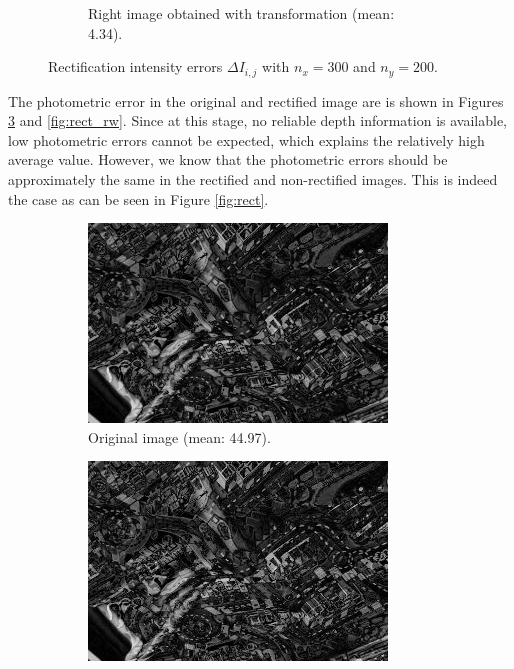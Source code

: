 \begin{figure}[h]
\begin{subfigure}[b]{0.7\textwidth}
    \caption{Right image obtained with transformation (mean: 4.34).}
    \label{fig:rect_r2_transform}
  \end{subfigure}
  \caption{Rectification intensity errors $\Delta I_{i,j}$ with $n_x = 300$ and $n_y = 200$.}
\end{figure}

The photometric error in the original and rectified image are is shown in Figures
\ref{fig:rect_ru} and \ref{fig:rect_rw}. Since at this stage, no reliable depth
information is available, low photometric errors cannot be expected, which explains 
the relatively high average value. However, we know that the photometric errors should 
be approximately the same in the rectified and non-rectified images.
This is indeed the case as can be seen in Figure \ref{fig:rect}.

\begin{figure}[h]
  \centering
  \begin{subfigure}[b]{0.49\textwidth}
    \includegraphics[width=\textwidth]{figures/rect_ru.jpg} 
    \caption{Original image (mean: 44.97).}
    \label{fig:rect_ru}
  \end{subfigure}
  \begin{subfigure}[b]{0.49\textwidth}
    \includegraphics[width=\textwidth]{figures/rect_rw.jpg} 

\end{subfigure}
\end{figure}
